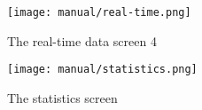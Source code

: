 \begin{figure}[ht!]
\centering
\begin{minipage}{.5\textwidth}
  \centering
  \texttt{[image: manual/real-time.png]}
  \caption{\label{fig:vitals}The real-time data screen 4}

\end{minipage}%
\begin{minipage}{.5\textwidth}
  \centering
  \texttt{[image: manual/statistics.png]}
  \caption{\label{fig:statistic}The statistics screen}
\end{minipage}
\end{figure}
